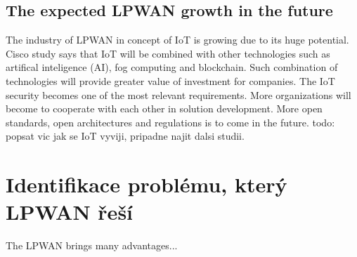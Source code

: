 \section{The expected LPWAN growth in the future}
The industry of LPWAN in concept of IoT is growing due to its huge potential.
Cisco study \cite{IoT cisco study} says that IoT will be combined with other technologies such as artifical inteligence (AI), fog computing and blockchain. Such combination of technologies will provide greater value of investment for companies. 
The IoT security becomes one of the most relevant requirements.
More organizations will become to cooperate with each other in solution development.
More open standards, open architectures and regulations is to come in the future.
todo: popsat vic jak se IoT vyviji, pripadne najit dalsi studii.
















\chapter{Identifikace problému, který LPWAN řeší}
The LPWAN brings many advantages...























